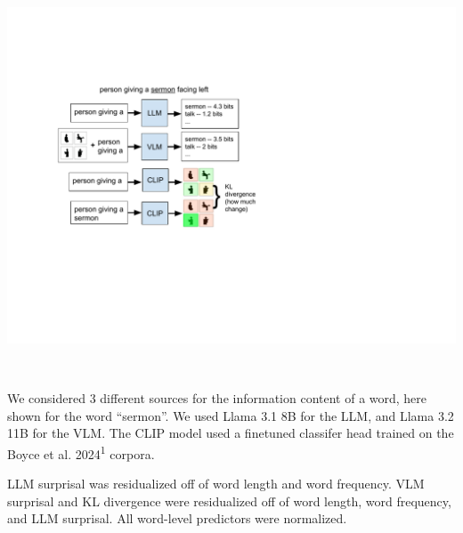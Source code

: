 \documentclass[11pt,a4paper]{article}
\begin{document}
\bigskip



\begin{minipage}{.5\textwidth}
	\includegraphics[width=\textwidth, trim = 3.2cm 7.7cm 13.5cm 6cm, clip]{preds.pdf} 

	
\end{minipage}
~~
\begin{minipage}{.45\textwidth}
	\begin{small}
	We considered 3 different sources for the information content of a word, here shown for the word ``sermon''. We used Llama 3.1 8B for the LLM, and Llama 3.2 11B for the VLM. The CLIP model used a finetuned classifer head trained on the Boyce et al. 2024\textsuperscript{1} corpora.
	
	\smallskip
	
LLM surprisal was residualized off of word length and word frequency. VLM surprisal and KL divergence were residualized off of word length, word frequency, and LLM surprisal. All word-level predictors were normalized. 
	
\end{small}
	
\end{minipage}

\bigskip
\end{document}
